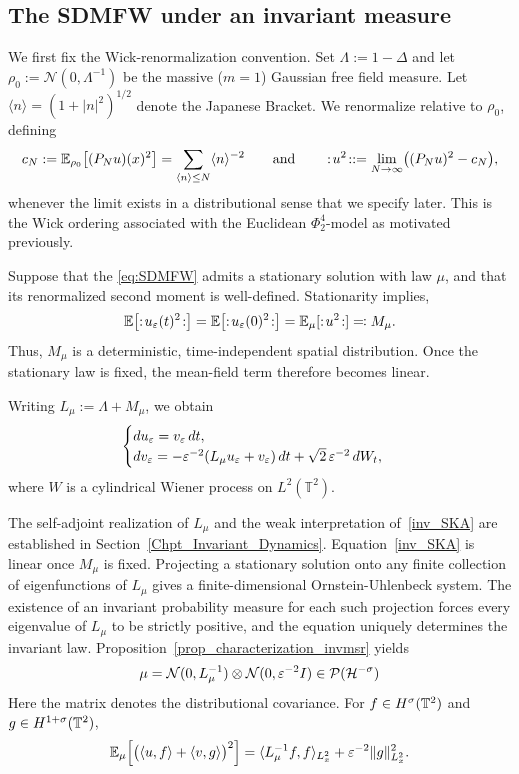 \subsection{The SDMFW under an invariant measure}\label{sec:SDMFW_inv_msr}

We first fix the Wick-renormalization convention. Set
$\Lambda := 1-\Delta$ and let $\rho_0 := \mathcal{N}(0,\Lambda^{-1})$ be the massive ($m = 1$) Gaussian
free field measure. Let $\langle n\rangle=(1+|n|^2)^{1/2}$ denote the Japanese Bracket. We renormalize relative to $\rho_0$, defining
\[
    c_N := \mathbb{E}_{\rho_0}\bigl[(P_N u)(x)^2\bigr] = \sum_{\langle n\rangle\leq N}\langle n\rangle^{-2}
    \qquad \text{and} \qquad
    :\! u^2 \!: := \lim_{N\to\infty}\bigl((P_N u)^2-c_N\bigr),
\]
whenever the limit exists in a distributional sense that we specify later. This is the Wick ordering associated with the Euclidean $\Phi^4_2$-model as motivated previously. 

Suppose that the \eqref{eq:SDMFW} admits a stationary solution with law $\mu$, and that its renormalized second moment is well-defined. Stationarity implies, 
\[
    \mathbb{E}\bigl[:\! u_\varepsilon(t)^2 \!:\bigr]
    = \mathbb{E}\bigl[:\! u_\varepsilon(0)^2 \!:\bigr] = \mathbb{E}_{\mu}[:\! u^2 \!:] \eqcolon M_\mu.
\]
Thus, $M_\mu$ is a deterministic, time-independent spatial distribution. Once the stationary law is fixed, the mean-field term therefore becomes linear.

Writing $L_\mu := \Lambda+M_\mu$, we obtain
\begin{equation}\label{inv_SKA}
    \begin{cases}
        du_\varepsilon=v_\varepsilon\,dt,\\
        dv_\varepsilon=-\varepsilon^{-2}(L_\mu u_\varepsilon+v_\varepsilon)\,dt
        +\sqrt2\,\varepsilon^{-2}\,dW_t,
    \end{cases}
\end{equation}
where $W$ is a cylindrical Wiener process on $L^2(\mathbb{T}^2)$.


The self-adjoint realization of $L_\mu$ and the weak interpretation of~\eqref{inv_SKA} are established in Section~\ref{Chpt_Invariant_Dynamics}.  
Equation~\eqref{inv_SKA} is linear once $M_\mu$ is fixed.  Projecting a
stationary solution onto any finite collection of eigenfunctions of
$L_\mu$ gives a finite-dimensional Ornstein-Uhlenbeck system.
The existence of an invariant probability measure for each such
projection forces every eigenvalue of $L_\mu$ to be strictly positive,
and the equation uniquely determines the invariant law. Proposition~\ref{prop_characterization_invmsr} yields
\[
    \mu = \mathcal{N}(0, L_\mu^{-1}) \otimes \mathcal{N}(0, \varepsilon^{-2}I) \in \mathcal P(\mathcal{H}^{-\sigma})
\]
Here the matrix denotes the distributional covariance.  For
$f\in H^\sigma(\mathbb{T}^2)$ and $g\in H^{1+\sigma}(\mathbb{T}^2)$,
\begin{align*}
    \EVMU{\bigl(\langle u,f\rangle+\langle v,g\rangle\bigr)^2}
    =
    \langle L_\mu^{-1}f,f\rangle_{L^2_x} +\varepsilon^{-2}\|g\|_{L^2_x}^2.
\end{align*}


